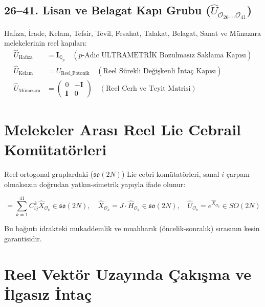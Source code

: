 \documentclass[11pt, a4paper]{article}
\begin{document}
\subsection{26--41. Lisan ve Belagat Kapı Grubu ($\hat{U}_{\mathcal{O}_{26} \dots \mathcal{O}_{41}}$)}
Hafıza, İrade, Kelam, Tefsir, Tevil, Fesahat, Talakat, Belagat, Sanat ve Münazara melekelerinin reel kapıları:
\begin{align}
\hat{U}_{\text{Hafıza}} &= \mathbf{I}_{\mathbb{Q}_p} \quad (\text{$p$-Adic ULTRAMETRİK Bozulmasız Saklama Kapısı}) \\
\hat{U}_{\text{Kelam}} &= U_{\text{Reel\_Fotonik}} \quad (\text{Reel Sürekli Değişkenli İntaç Kapısı}) \\
\hat{U}_{\text{Münazara}} &= \begin{pmatrix} 0 & -\mathbf{I} \\ \mathbf{I} & 0 \end{pmatrix} \quad (\text{Reel Cerh ve Teyit Matrisi})
\end{align}

\section{Melekeler Arası Reel Lie Cebrail Komütatörleri}

Reel ortogonal gruplardaki ($\mathfrak{so}(2N)$) Lie cebri komütatörleri, sanal $i$ çarpanı olmaksızın doğrudan yatkın-simetrik yapıyla ifade olunur:

\begin{equation}
[\hat{X}_{\mathcal{O}_i}, \hat{X}_{\mathcal{O}_j}] = \sum_{k=1}^{41} C_{ij}^k \hat{X}_{\mathcal{O}_k} \in \mathfrak{so}(2N), \quad \hat{X}_{\mathcal{O}_k} = J \cdot \hat{H}_{\mathcal{O}_k} \in \mathfrak{so}(2N), \quad \hat{U}_{\mathcal{O}_k} = e^{\hat{X}_{\mathcal{O}_k}} \in SO(2N)
\end{equation}

Bu bağıntı idrakteki mukaddemlik ve muahharık (öncelik-sonralık) sırasının kesin garantisidir.

\section{Reel Vektör Uzayında Çakışma ve İlgasız İntaç}
\end{document}
